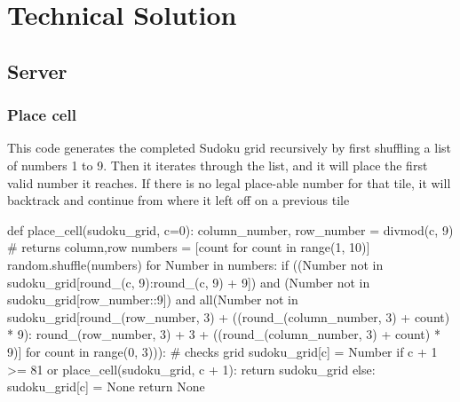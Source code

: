 \documentclass[fleqn]{article}
\begin{document}
\section{Technical Solution}

\subsection{Server}

\subsubsection{Place cell}
 
This code generates the completed Sudoku grid recursively by first shuffling a list of numbers 1 to 9. Then it iterates through the list, and it will place the first valid number it reaches. If there is no legal place-able number for that tile, it will backtrack and continue from where it left off on a previous tile








\begin{python}
def place_cell(sudoku_grid, c=0):
    column_number, row_number = divmod(c, 9)  # returns column,row
    numbers = [count for count in range(1, 10)]
    random.shuffle(numbers)
    for Number in numbers:
        if ((Number not in sudoku_grid[round_(c, 9):round_(c, 9) + 9]) and
                (Number not in sudoku_grid[row_number::9]) and
                all(Number not in sudoku_grid[round_(row_number, 3) + ((round_(column_number, 3) + count) * 9):
                    round_(row_number, 3) + 3 + ((round_(column_number, 3) + count) * 9)]
                    for count in range(0, 3))):  # checks grid
            sudoku_grid[c] = Number
            if c + 1 >= 81 or place_cell(sudoku_grid, c + 1):
                return sudoku_grid
    else:
        sudoku_grid[c] = None
        return None
\end{python}
\end{document}
